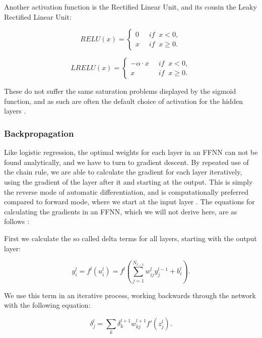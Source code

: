 \documentclass[onecolumn,10pt,cleanfoot]{asme2ej}
\begin{document}
Another activation function is the Rectified Linear Unit, and its cousin the Leaky Rectified Linear Unit:

\begin{equation}
RELU(x) = \left\{\begin{array}{cc} 0 & \; \; if \; \; x < 0, \\  x & \; \; if \; \; x \ge 0.\end{array}\right.
\end{equation}

\begin{equation}
LRELU(x) = \left\{\begin{array}{cc} -\alpha \cdot x & \; \; if \; \; x < 0, \\  x & \; \; if \; \; x \ge 0.\end{array}\right.
\end{equation}

These do not suffer the same saturation problems displayed by the sigmoid function, and as such are often the default choice of activation for the hidden layers \cite[188]{gbc}.

\subsubsection{Backpropagation}

Like logistic regression, the optimal weights for each layer in an FFNN can not be found analytically, and we have to turn to gradient descent. By repeated use of the chain rule, we are able to calculate the gradient for each layer iteratively, using the gradient of the layer after it and starting at the output. This is simply the reverse mode of automatic differentiation, and is computationally preferred compared to forward mode, where we start at the input layer \cite[416]{sr}. The equations for calculating the gradients in an FFNN, which we will not derive here, are as follows \cite{morten}:

First we calculate the so called delta terms for all layers, starting with the output layer:

\begin{equation}
y_i^l = f^l(u_i^l) = f^l\left(\sum_{j=1}^{N_{l-1}} w_{ij}^l y_j^{l-1} + b_i^l\right).
\end{equation}

We use this term in an iterative process, working backwards through the network with the following equation:

\begin{equation}
\delta_j^l = \sum_k \delta_k^{l+1}w_{kj}^{l+1}f'(z_j^l).
\end{equation}
\end{document}
